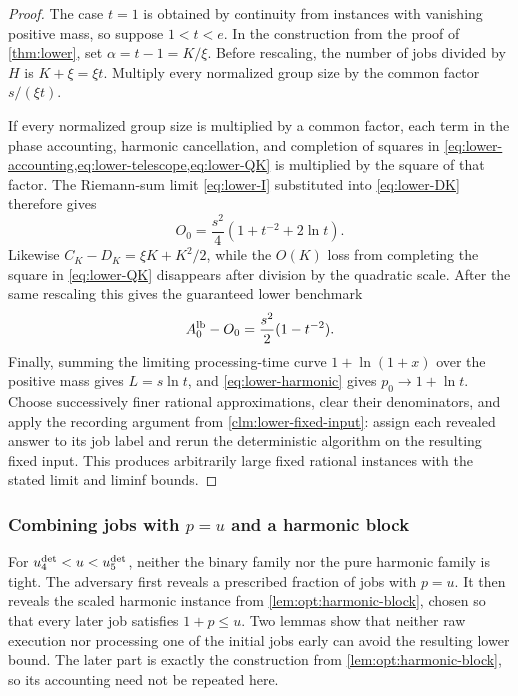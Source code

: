 \begin{proof}
The case $t=1$ is obtained by continuity from instances with vanishing
positive mass, so suppose $1<t<e$.  In the construction from the proof of
\cref{thm:lower}, set
$\alpha=t-1=K/\xi$.  Before rescaling, the number of jobs divided by $H$ is
$K+\xi=\xi t$.  Multiply every normalized group size by the common factor
$s/(\xi t)$.

If every normalized group size is multiplied by a common factor, each term
in the phase accounting, harmonic cancellation, and completion of squares in
\cref{eq:lower-accounting,eq:lower-telescope,eq:lower-QK} is multiplied by
the square of that factor.  The Riemann-sum limit
\cref{eq:lower-I} substituted into \cref{eq:lower-DK} therefore gives
\[
 O_0=\frac{s^2}{4}(1+t^{-2}+2\ln t).
\]
Likewise $C_K-D_K=\xi K+K^2/2$, while the $O(K)$ loss from completing the square in
\cref{eq:lower-QK} disappears after division by the quadratic scale.  After
the same rescaling this gives the guaranteed lower benchmark
\[
 A_0^{\rm lb}-O_0=\frac{s^2}{2}(1-t^{-2}).
\]
Finally, summing the limiting processing-time curve
$1+\ln(1+x)$ over the positive mass gives $L=s\ln t$, and
\cref{eq:lower-harmonic} gives $p_0\to1+\ln t$.  Choose successively finer
rational approximations, clear their denominators, and apply the recording
argument from \cref{clm:lower-fixed-input}: assign each revealed answer to
its job label and rerun the deterministic algorithm on the resulting fixed
input.  This produces arbitrarily large fixed rational instances with the
stated limit and liminf bounds.
\end{proof}

\subsubsection{Combining jobs with \texorpdfstring{$p=u$}{p = u} and a harmonic block}
\label{sec:opt:middle-lower}

For $u_{4}^{\mathrm{det}}<u<u_{5}^{\mathrm{det}}$, neither the binary family nor the pure harmonic
family is tight.  The adversary first reveals a prescribed fraction of jobs
with $p=u$.  It then reveals the scaled harmonic instance from
\cref{lem:opt:harmonic-block}, chosen so that every later job satisfies
$1+p\le u$.  Two lemmas
show that neither raw execution nor processing one of the initial jobs early
can avoid the resulting lower bound.  The later part is exactly the
construction from \cref{lem:opt:harmonic-block}, so its accounting need not
be repeated here.


